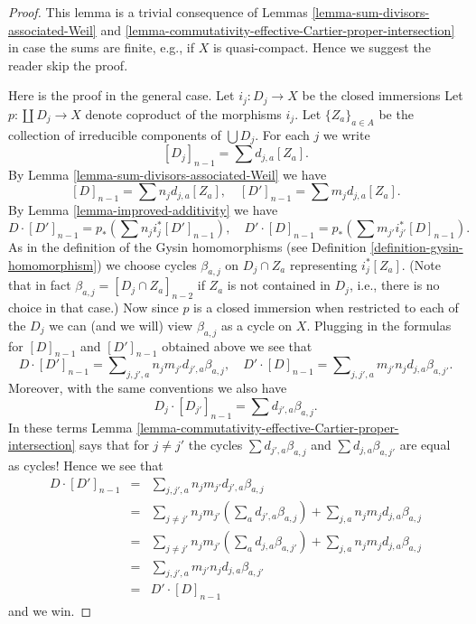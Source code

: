 \begin{proof}
This lemma is a trivial consequence of
Lemmas \ref{lemma-sum-divisors-associated-Weil} and
\ref{lemma-commutativity-effective-Cartier-proper-intersection}
in case the sums are finite, e.g., if $X$ is quasi-compact.
Hence we suggest the reader skip the proof.

\medskip\noindent
Here is the proof in the general case.
Let $i_j : D_j \to X$ be the closed immersions
Let $p : \coprod D_j \to X$ denote coproduct of the morphisms $i_j$.
Let $\{Z_a\}_{a \in A}$ be the collection of irreducible components of
$\bigcup D_j$. For each $j$ we write
$$
[D_j]_{n - 1} = \sum d_{j, a}[Z_a].
$$
By Lemma \ref{lemma-sum-divisors-associated-Weil} we have
$$
[D]_{n - 1} = \sum n_j d_{j, a} [Z_a],
\quad
[D']_{n - 1} = \sum m_j d_{j, a} [Z_a].
$$
By Lemma \ref{lemma-improved-additivity}
we have
$$
D \cdot [D']_{n - 1} = p_*\left(\sum n_j i_j^*[D']_{n - 1} \right),
\quad
D' \cdot [D]_{n - 1} = p_*\left(\sum m_{j'} i_{j'}^*[D]_{n - 1} \right).
$$
As in the definition of the Gysin homomorphisms (see
Definition \ref{definition-gysin-homomorphism})
we choose cycles $\beta_{a, j}$ on $D_j \cap Z_a$ representing
$i_j^*[Z_a]$. (Note that in fact $\beta_{a, j} = [D_j \cap Z_a]_{n - 2}$
if $Z_a$ is not contained in $D_j$, i.e., there is no choice in that case.)
Now since $p$ is a closed immersion when restricted to each of the $D_j$
we can (and we will) view $\beta_{a, j}$ as a cycle on $X$.
Plugging in the formulas for $[D]_{n - 1}$ and $[D']_{n - 1}$ obtained
above we see that
$$
D \cdot [D']_{n - 1} =
\sum\nolimits_{j, j', a} n_j m_{j'} d_{j', a} \beta_{a, j},
\quad
D' \cdot [D]_{n - 1} =
\sum\nolimits_{j, j', a} m_{j'} n_j d_{j, a} \beta_{a, j'}.
$$
Moreover, with the same conventions we also have
$$
D_j \cdot [D_{j'}]_{n - 1} = \sum d_{j', a} \beta_{a, j}.
$$
In these terms
Lemma \ref{lemma-commutativity-effective-Cartier-proper-intersection}
says that for $j \not = j'$ the cycles
$\sum d_{j', a} \beta_{a, j}$ and $\sum d_{j, a} \beta_{a, j'}$
are equal as cycles! Hence we see that
\begin{eqnarray*}
D \cdot [D']_{n - 1}
& = &
\sum\nolimits_{j, j', a} n_j m_{j'} d_{j', a} \beta_{a, j} \\
& = &
\sum\nolimits_{j \not = j'} n_j m_{j'}
\left(\sum\nolimits_a d_{j', a} \beta_{a, j}\right) +
\sum\nolimits_{j, a} n_j m_j d_{j, a} \beta_{a, j} \\
& = &
\sum\nolimits_{j \not = j'} n_j m_{j'}
\left(\sum\nolimits_a d_{j, a} \beta_{a, j'}\right) +
\sum\nolimits_{j, a} n_j m_j d_{j, a} \beta_{a, j} \\
& = &
\sum\nolimits_{j, j', a} m_{j'} n_j d_{j, a} \beta_{a, j'} \\
& = &
D' \cdot [D]_{n - 1}
\end{eqnarray*}
and we win.
\end{proof}

